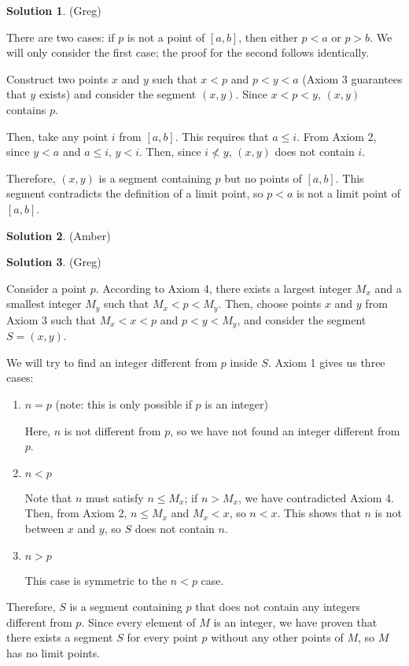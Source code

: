 \documentclass{article}
\theoremstyle{definition}
\newtheorem{solution}{Solution}
\begin{document}
\begin{solution} %
(Greg)

There are two cases: if $p$ is not a point of $[a, b]$, then either $p < a$ or $p > b$.
We will only consider the first case; the proof for the second follows identically.

Construct two points $x$ and $y$ such that $x < p$ and $p < y < a$ (Axiom 3 guarantees that $y$ exists) and consider the segment $(x, y)$.
Since $x < p < y$, $(x, y)$ contains $p$.

Then, take any point $i$ from $[a, b]$.
This requires that $a \leq i$.
From Axiom 2, since $y < a$ and $a \leq i$, $y < i$.
Then, since $i \nless y$, $(x, y)$ does not contain $i$.

Therefore, $(x, y)$ is a segment containing $p$ but no points of $[a, b]$.
This segment contradicts the definition of a limit point, so $p < a$ is not a limit point of $[a, b]$.
\end{solution}

\begin{solution} %
(Amber)

\end{solution}

\begin{solution} %
(Greg)

Consider a point $p$.
According to Axiom 4, there exists a largest integer $M_x$ and a smallest integer $M_y$ such that $M_x < p < M_y$.
Then, choose points $x$ and $y$ from Axiom 3 such that $M_x < x < p$ and $p < y < M_y$, and consider the segment $S = (x, y)$.

We will try to find an integer different from $p$ inside $S$.
Axiom 1 gives us three cases:

\begin{enumerate}
\item $n = p$ (note: this is only possible if $p$ is an integer)

Here, $n$ is not different from $p$, so we have not found an integer different from $p$.

\item $n < p$

Note that $n$ must satisfy $n \leq M_x$; if $n > M_x$, we have contradicted Axiom 4.
Then, from Axiom 2, $n \leq M_x$ and $M_x < x$, so $n < x$.
This shows that $n$ is not between $x$ and $y$, so $S$ does not contain $n$.

\item $n > p$

This case is symmetric to the $n < p$ case.

\end{enumerate}

Therefore, $S$ is a segment containing $p$ that does not contain any integers different from $p$.
Since every element of $M$ is an integer, we have proven that there exists a segment $S$ for every point $p$ without any other points of $M$, so $M$ has no limit points.

\end{solution}
\end{document}
